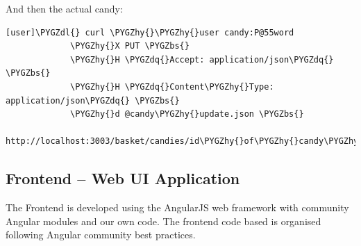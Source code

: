 \documentclass[letterpaper,10pt,english]{sphinxmanual}
\def\PYGZbs{\char`\\}
\def\PYGZdl{\char`\$}
\def\PYGZhy{\char`\-}
\def\PYGZdq{\char`\"}
\begin{document}
And then the actual candy:

\begin{Verbatim}[commandchars=\\\{\}]
[user]\PYGZdl{} curl \PYGZhy{}\PYGZhy{}user candy:P@55word
             \PYGZhy{}X PUT \PYGZbs{}
             \PYGZhy{}H \PYGZdq{}Accept: application/json\PYGZdq{}  \PYGZbs{}
             \PYGZhy{}H \PYGZdq{}Content\PYGZhy{}Type: application/json\PYGZdq{} \PYGZbs{}
             \PYGZhy{}d @candy\PYGZhy{}update.json \PYGZbs{}
             http://localhost:3003/basket/candies/id\PYGZhy{}of\PYGZhy{}candy\PYGZhy{}in\PYGZhy{}couchdb
\end{Verbatim}


\subsection{Frontend -- Web UI Application}
\label{developer-guide:frontend-web-ui-application}
The Frontend is developed using the AngularJS web framework with
community Angular modules and our own code. The frontend code based is
organised following Angular community best practices.
\end{document}
